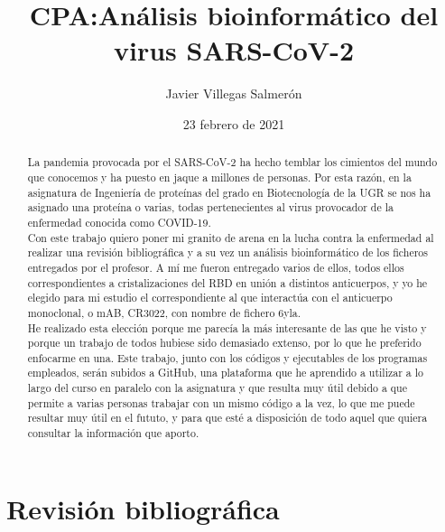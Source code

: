 \documentclass[a4paper,11pt]{report}
\begin{document}
	\title{CPA:Análisis bioinformático  del virus SARS-CoV-2}
	\author{Javier Villegas Salmerón}
	\date{23 febrero de 2021}
	\maketitle
	\begin{abstract}
		La pandemia provocada por el SARS-CoV-2 ha hecho temblar los cimientos del mundo que conocemos y ha puesto en jaque a millones de personas. Por esta razón, en la asignatura de Ingeniería de proteínas del grado en Biotecnología de la UGR se nos ha asignado una proteína o varias, todas pertenecientes al virus provocador de la enfermedad conocida como COVID-19.
\\Con este trabajo quiero poner mi granito de arena en la lucha contra la enfermedad al realizar una revisión bibliográfica y a su vez un análisis bioinformático de los ficheros entregados por el profesor. A mí me fueron entregado varios de ellos, todos ellos correspondientes a cristalizaciones del RBD en unión a distintos anticuerpos, y yo he elegido para mi estudio el correspondiente al que interactúa con el anticuerpo monoclonal, o mAB, CR3022, con nombre de fichero 6yla.
\\He realizado esta elección porque me parecía la más interesante de las que he visto y porque un trabajo de todos hubiese sido demasiado extenso, por lo que he preferido enfocarme en una.
Este trabajo, junto con los códigos y ejecutables de los programas empleados, serán subidos a GitHub, una plataforma que he aprendido a utilizar a lo largo del curso en paralelo con la asignatura y que resulta muy útil debido a que permite a varias personas trabajar con un mismo código a la vez, lo que me puede resultar muy útil en el fututo, y para que esté a disposición de todo aquel que quiera consultar la información que aporto.
	\end{abstract}
 \tableofcontents
 \chapter{Revisión bibliográfica}
\end{document}
